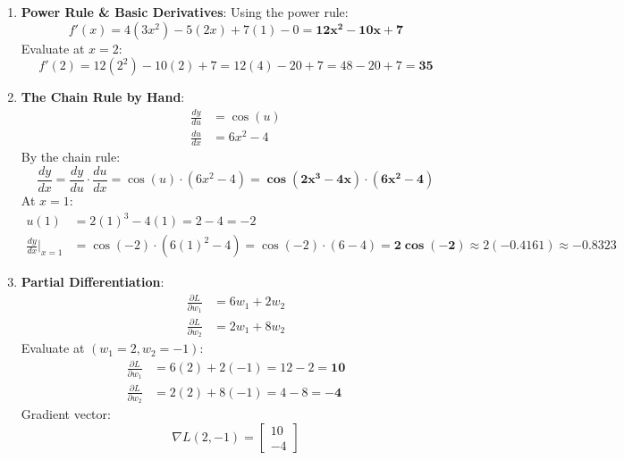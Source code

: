 \begin{enumerate}
    \item \textbf{Power Rule \& Basic Derivatives}:
    Using the power rule:
    \begin{equation*}
    f'(x) = 4(3x^2) - 5(2x) + 7(1) - 0 = \mathbf{12x^2 - 10x + 7}
    \end{equation*}
    Evaluate at $x = 2$:
    \begin{equation*}
    f'(2) = 12(2^2) - 10(2) + 7 = 12(4) - 20 + 7 = 48 - 20 + 7 = \mathbf{35}
    \end{equation*}

    \item \textbf{The Chain Rule by Hand}:
    \begin{align*}
    \frac{dy}{du} &= \cos(u) \\
    \frac{du}{dx} &= 6x^2 - 4
    \end{align*}
    By the chain rule:
    \begin{equation*}
    \frac{dy}{dx} = \frac{dy}{du} \cdot \frac{du}{dx} = \cos(u) \cdot (6x^2 - 4) = \mathbf{\cos(2x^3 - 4x) \cdot (6x^2 - 4)}
    \end{equation*}
    At $x = 1$:
    \begin{align*}
    u(1) &= 2(1)^3 - 4(1) = 2 - 4 = -2 \\
    \frac{dy}{dx}\Big|_{x=1} &= \cos(-2) \cdot (6(1)^2 - 4) = \cos(-2) \cdot (6 - 4) = \mathbf{2 \cos(-2)} \approx 2(-0.4161) \approx \mathbf{-0.8323}
    \end{align*}

    \item \textbf{Partial Differentiation}:
    \begin{align*}
    \frac{\partial L}{\partial w_1} &= 6w_1 + 2w_2 \\
    \frac{\partial L}{\partial w_2} &= 2w_1 + 8w_2
    \end{align*}
    Evaluate at $(w_1 = 2, w_2 = -1)$:
    \begin{align*}
    \frac{\partial L}{\partial w_1} &= 6(2) + 2(-1) = 12 - 2 = \mathbf{10} \\
    \frac{\partial L}{\partial w_2} &= 2(2) + 8(-1) = 4 - 8 = \mathbf{-4}
    \end{align*}
    Gradient vector:
    \begin{equation*}
    \nabla L(2, -1) = \begin{bmatrix} 10 \\ -4 \end{bmatrix}
    \end{equation*}


\end{enumerate}
